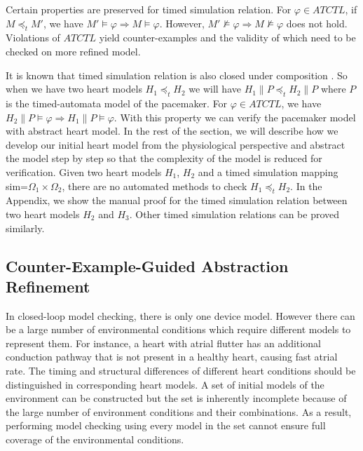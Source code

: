Certain properties are preserved for timed simulation relation. For $\varphi\in ATCTL$, if $M\preceq_t M'$, we have $M'\models \varphi\Rightarrow M\models\varphi$.\cite{simulation} However, $M'\not\models \varphi\Rightarrow M\not\models\varphi$ does not hold. Violations of $ATCTL$ yield \textsf{counter-examples} and the validity of which need to be checked on more refined model.


It is known that timed simulation relation is also closed under composition \cite{simulation}. So when we have two heart models $H_1\preceq_t H_2$ we will have $H_1\| P\preceq_t H_2\| P$ where $P$ is the timed-automata model of the pacemaker. For $\varphi\in ATCTL$, we have $H_2\| P\models\varphi\Rightarrow H_1\| P\models\varphi$. With this property we can verify the pacemaker model with abstract heart model. In the rest of the section, we will describe how we develop our initial heart model from the physiological perspective and abstract the model step by step so that the complexity of the model is reduced for verification. Given two heart models $H_1$, $H_2$ and a timed simulation mapping \textsf{sim}=$\Omega_1\times\Omega_2$, there are no automated methods to check $H_1\preceq_t H_2$. In the Appendix, we show the manual proof for the timed simulation relation between two heart models $H_2$ and $H_3$. Other timed simulation relations can be proved similarly.

\subsection{Counter-Example-Guided Abstraction Refinement}
In closed-loop model checking, there is only one device model. 
However there can be a large number of environmental conditions which require different models to represent them. For instance, a heart with atrial flutter has an additional conduction pathway that is not present in a healthy heart, causing fast atrial rate. The timing and structural differences of different heart conditions should be distinguished in corresponding heart models.
A set of initial models of the environment can be constructed but the set is inherently incomplete because of the large number of environment conditions and their combinations. 
As a result, performing model checking using every model in the set cannot ensure full coverage of the environmental conditions. 

